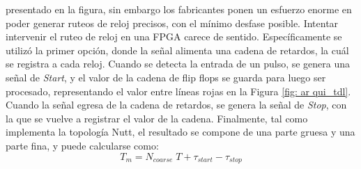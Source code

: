 presentado en la figura, sin embargo los fabricantes ponen un esfuerzo enorme en poder generar ruteos
de reloj precisos, con el mínimo desfase posible. Intentar intervenir el ruteo de reloj en una FPGA
carece de sentido. Específicamente se utilizó la primer opción, donde la señal alimenta una cadena de retardos, la cuál se 
registra a cada reloj. Cuando se detecta la entrada de un pulso, se genera una señal de \textit{Start}, y
el valor de la cadena de flip flops se guarda para luego ser procesado, representando el valor entre líneas
rojas en la Figura \ref{fig: ar    qui_tdl}. Cuando la señal egresa de la cadena de retardos, se genera la señal
 de \textit{Stop}, con la que se vuelve a registrar el valor de la cadena. Finalmente, tal como implementa la
topología Nutt, el resultado se compone de una parte gruesa y una parte fina, y puede calcularse como:
\begin{equation*}
     T_{m} = N_{coarse} \; T + \tau_{start} - \tau_{stop}
\end{equation*}

